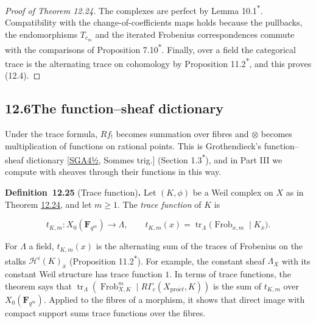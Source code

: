 \documentclass[11pt]{article}
\newenvironment{bpstatement}[2]{\par\addvspace{0.6\baselineskip}\noindent\textbf{#1}#2\textbf{.}\enspace\ignorespaces}
  {\par\addvspace{0.4\baselineskip}}
\newcommand{\bpout}[1]{#1\textsuperscript{\hyperlink{bp-outside}{\ensuremath{\ast}}}}
\begin{document}
\begin{proof}[{Proof of Theorem 12.24}]
The complexes are perfect by Lemma \bpout{10.1}. Compatibility with the change-of-coefficients maps holds because the pullbacks, the endomorphisms \(T_{c_m}\) and the iterated Frobenius correspondences commute with the comparisons of Proposition \bpout{7.10}. Finally, over a field the categorical trace is the alternating trace on cohomology by Proposition \bpout{11.2}, and this proves (12.4).
\end{proof}


\subsection*{\texorpdfstring{12.6\quad The function–sheaf dictionary}{12.6 The function–sheaf dictionary}}
\label{bp76}%
\label{bp77}%
Under the trace formula, \(Rf_!\) becomes summation over fibres and \(\otimes\) becomes multiplication of functions on rational points. This is Grothendieck's function–sheaf dictionary [\hyperref[bp106]{SGA4½}, Sommes trig.] (Section \bpout{1.3}), and in Part III we compute with sheaves through their functions in this way.

\label{bp78}%
\begin{bpstatement}{Definition~12.25}{ (Trace function)}
Let \((K,\phi)\) be a Weil complex on \(X\) as in Theorem \hyperref[bp73]{12.24}, and let \(m\geq1\). The \emph{trace function} of \(K\) is

\[
t_{K,m}:X_0(\mathbf F_{q^m})\longrightarrow\Lambda,\qquad
t_{K,m}(x)=\operatorname{tr}_\Lambda\bigl(\operatorname{Frob}_{x,m}
\mid K_{\bar x}\bigr).
\]
\end{bpstatement}

\label{bp79}%
For \(\Lambda\) a field, \(t_{K,m}(x)\) is the alternating sum of the traces of Frobenius on the stalks \(\mathcal H^i(K)_{\bar x}\) (Proposition \bpout{11.2}). For example, the constant sheaf \(\Lambda_X\) with its constant Weil structure has trace function \(1\). In terms of trace functions, the theorem says that \(\operatorname{tr}_\Lambda(\operatorname{Frob}_{X,K}^m
\mid R\Gamma_c(X_{\mathrm{pro}\acute{e}t},K))\) is the sum of \(t_{K,m}\) over \(X_0(\mathbf F_{q^m})\). Applied to the fibres of a morphism, it shows that direct image with compact support sums trace functions over the fibres.
\end{document}
